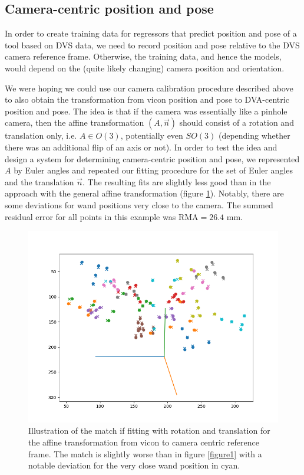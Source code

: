 \documentclass{article}
\begin{document}
\subsection{Camera-centric position and pose}
In order to create training data for regressors that predict position and pose of a tool based on DVS data, we need to record position and pose relative to the DVS camera reference frame. Otherwise, the training data, and hence the models, would depend on the (quite likely changing) camera position and orientation.

We were hoping we could use our camera calibration procedure described above to also obtain the transformation from vicon position and pose to DVA-centric position and pose. The idea is that if the camera was essentially like a pinhole camera, then the affine transformation $(A,\vec{n})$ should consist of a rotation  and translation only, i.e. $A \in O(3)$, potentially even $SO(3)$ (depending whether there was an additional flip of an axis or not).
In order to test the idea and design a system for determining camera-centric position and pose, we represented $A$ by Euler angles and repeated our fitting procedure for the set of Euler angles and the translation $\vec{n}$. The resulting fits are slightly less good than in the approach with the general affine transformation (figure \ref{figure2}). Notably, there are some deviations for wand positions very close to the camera. The summed residual error for all points in this example was RMA$= 26.4$ mm.

\begin{figure}
  \includegraphics[width=\textwidth]{figure_match_euler.png}
  \caption{\label{figure2} Illustration of the match if fitting with rotation and translation for the affine transformation from vicon to camera centric reference frame. The match is slightly worse than in figure \ref{figure1} with a notable deviation for the very close wand position in cyan.} 
\end{figure}
\end{document}
